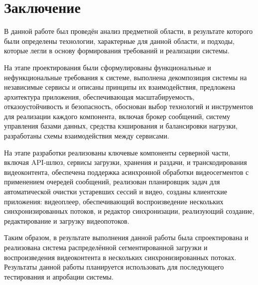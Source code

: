 \chapter{Заключение}

	В данной работе был проведён анализ предметной области, в результате которого были определены технологии, характерные для данной области, и подходы, которые легли в основу формирования требований и реализации системы.

	На этапе проектирования были сформулированы функциональные и нефункциональные требования к системе, выполнена декомпозиция системы на независимые сервисы и описаны принципы их взаимодействия, предложена архитектура приложения, обеспечивающая масштабируемость, отказоустойчивость и безопасность, обоснован выбор технологий и инструментов для реализации каждого компонента, включая брокер сообщений, систему управления базами данных, средства кэширования и балансировки нагрузки, разработаны схемы взаимодействия между сервисами.

	На этапе разработки реализованы ключевые компоненты серверной части, включая API-шлюз, сервисы загрузки, хранения и раздачи, и транскодирования видеоконтента, обеспечена поддержка асинхронной обработки видеосегментов с применением очередей сообщений, реализован планировщик задач для автоматической очистки устаревших сессий и видео, созданы клиентские приложения: видеоплеер, обеспечивающий воспроизведение нескольких синхронизированных потоков, и редактор синхронизации, реализующий создание, редактирование и загрузку видеопотоков.

	Таким образом, в результате выполнения данной работы была спроектирована и реализована система распределённой сегментированной загрузки и воспроизведения видеоконтента в нескольких синхронизированных потоках. Результаты данной работы планируется использовать для последующего тестирования и апробации системы.
